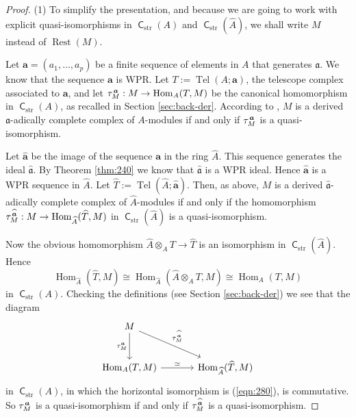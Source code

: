 \documentclass[10pt]{amsart}
\theoremstyle{definition}
\numberwithin{equation}{section}
\newcommand{\opn}{\operatorname}
\newcommand{\cat}[1]{\operatorname{\mathsf{#1}}}
\newcommand{\mfrak}[1]{\mathfrak{#1}}
\newcommand{\mrm}[1]{\mathrm{#1}}
\renewcommand{\a}{\mfrak{a}}
\newcommand{\ba}{\bsym{a}}
\newcommand{\bsym}[1]{\boldsymbol{#1}}
\newcommand{\ot}{\otimes}
\newcommand{\what}[1]{\widehat{#1}}
\newcommand{\msp}[1]{\mspace{#1 mu}}
\begin{document}
\begin{proof}
(1) To simplify the presentation, and because we are going to work with explicit
quasi-isomorphisms in $\cat{C}_{\mrm{str}}(A)$ and
$\cat{C}_{\mrm{str}}(\what{A})$, we shall write $M$ instead of
$\opn{Rest}(M)$.

Let $\ba = (a_1, \ldots, a_p)$ be a finite sequence of elements in $A$ that
generates $\a$. We know that the sequence $\ba$ is WPR.
Let $T := \opn{Tel}(A; \ba)$, the telescope complex associated to $\ba$,
and let
$\tau^{\msp{2} \ba}_{M} : M \to \opn{Hom}_{A}(T, M)$
be the canonical homomorphism in $\cat{C}_{\mrm{str}}(A)$, as recalled in
Section \ref{sec:back-der}.
According to \cite[Corollary 5.25]{PSY1}, $M$ is a derived $\a$-adically
complete complex of $A$-modules if and only if
$\tau^{\msp{2} \ba}_{M}$ is a quasi-isomorphism.

Let $\what{\ba}$ be the image of the sequence $\ba$ in the ring $\what{A}$.
This sequence generates the ideal $\what{\a}$. By Theorem \ref{thm:240} we know
that $\what{\a}$ is a WPR ideal. Hence $\what{\ba}$ is a WPR sequence in
$\what{A}$. Let $\what{T} := \opn{Tel}(\what{A}; \what{\ba})$. Then, as above,
$M$ is a derived $\what{\a}$-adically complete complex of
$\what{A}$-modules if and only if
the homomorphism
$\tau^{\msp{2} \what{\ba}}_{M} : M \to
\opn{Hom}_{\what{A}}(\what{T}, M)$
in $\cat{C}_{\mrm{str}}(\what{A})$
is a quasi-isomorphism.

Now the obvious homomorphism $\what{A} \ot_A T \to \what{T}$
is an isomorphism in
$\cat{C}_{\mrm{str}}(\what{A})$. Hence
\begin{equation} \label{eqn:280}
\opn{Hom}_{\what{A}}(\what{T}, M) \cong
\opn{Hom}_{\what{A}}( \what{A} \ot_A T, M)
\cong \opn{Hom}_{A}(T, M)
\end{equation}
in $\cat{C}_{\mrm{str}}(A)$. Checking the definitions (see Section
\ref{sec:back-der})  we see that the diagram
\[ \begin{tikzcd} [column sep = 8ex, row sep = 6ex]
M
\ar[d, "{\tau^{\ba}_{M}}"']
\ar[dr, "{\tau^{\msp{2} \what{\ba}}_{M}}"]
\\
\opn{Hom}_{A}(T, M)
\ar[r, "{\simeq}"]
&
\opn{Hom}_{\what{A}}(\what{T}, M)
\end{tikzcd} \]
in $\cat{C}_{\mrm{str}}(A)$, in which the horizontal isomorphism is
(\ref{eqn:280}),  is commutative.
So $\tau^{\msp{2} \ba}_{M}$ is a quasi-isomorphism if and only if
$\tau^{\msp{2} \what{\ba}}_{M}$ is a quasi-isomorphism.


\end{proof}
\end{document}
